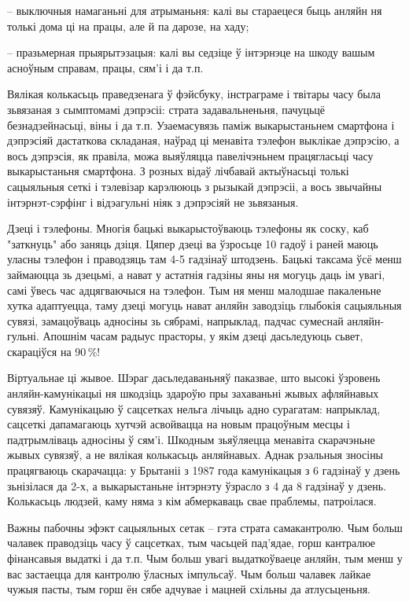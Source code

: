 – выключныя намаганьні для атрыманьня: калі вы стараецеся быць анляйн ня толькі дома ці на працы, але й па дарозе, на хаду;

– празьмерная прыярытэзацыя: калі вы седзіце ў інтэрнэце на шкоду вашым асноўным справам, працы, сям'і і да т.п.

Вялікая колькасьць праведзенага ў фэйсбуку, інстраграме і твітары часу была зьвязаная з сымптомамі дэпрэсіі: страта задавальненьня, пачуцьцё безнадзейнасьці, віны і да т.п. Узаемасувязь паміж выкарыстаньнем смартфона і дэпрэсіяй дастаткова складаная, наўрад ці менавіта тэлефон выклікае дэпрэсію, а вось дэпрэсія, як правіла, можа выяўляцца павелічэньнем працягласьці часу выкарыстаньня смартфона. З розных відаў лічбавай актыўнасьці толькі сацыяльныя сеткі і тэлевізар карэлююць з рызыкай дэпрэсіі, а вось звычайны інтэрнэт-сэрфінг і відэагульні ніяк з дэпрэсіяй не зьвязаныя.

Дзеці і тэлефоны. Многія бацькі выкарыстоўваюць тэлефоны як соску, каб "заткнуць" або заняць дзіця. Цяпер дзеці ва ўзросьце 10 гадоў і раней маюць уласны тэлефон і праводзяць там 4-5 гадзінаў штодзень. Бацькі таксама ўсё менш займаюцца зь дзецьмі, а нават у астатнія гадзіны яны ня могуць даць ім увагі, самі ўвесь час адцягваючыся на тэлефон. Тым ня менш малодшае пакаленьне хутка адаптуецца, таму дзеці могуць нават анляйн заводзіць глыбокія сацыяльныя сувязі, замацоўваць адносіны зь сябрамі, напрыклад, падчас сумеснай анляйн-гульні. Апошнім часам радыус прасторы, у якім дзеці дасьледуюць сьвет, скараціўся на 90\,\%!

Віртуальнае ці жывое. Шэраг дасьледаваньняў паказвае, што высокі ўзровень анляйн-камунікацыі ня шкодзіць здароўю пры захаваньні жывых афляйнавых сувязяў. Камунікацыю ў сацсетках нельга лічыць адно сурагатам: напрыклад, сацсеткі дапамагаюць хутчэй асвойвацца на новым працоўным месцы і падтрымліваць адносіны ў сям'і. Шкодным зьяўляецца менавіта скарачэньне жывых сувязяў, а не вялікая колькасьць анляйнавых. Аднак рэальныя зносіны працягваюць скарачацца: у Брытаніі з 1987 года камунікацыя з 6 гадзінаў у дзень зьнізілася да 2-х, а выкарыстаньне інтэрнэту ўзрасло з 4 да 8 гадзінаў у дзень. Колькасьць людзей, каму няма з кім абмеркаваць свае праблемы, патроілася.

Важны пабочны эфэкт сацыяльных сетак – гэта страта самакантролю. Чым больш чалавек праводзіць часу ў сацсетках, тым часьцей пад'ядае, горш кантралюе фінансавыя выдаткі і да т.п. Чым больш увагі выдаткоўваеце анляйн, тым менш у вас застаецца для кантролю ўласных імпульсаў. Чым больш чалавек лайкае чужыя пасты, тым горш ён сябе адчувае і мацней схільны да атлусьценьня.


